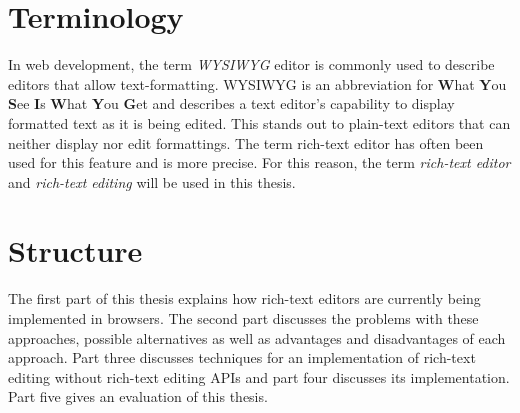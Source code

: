 \section{Terminology}

In web development, the term \textit{WYSIWYG} editor is commonly used to describe editors that allow text-formatting. WYSIWYG is an abbreviation for \textbf{W}hat \textbf{Y}ou \textbf{S}ee \textbf{I}s \textbf{W}hat \textbf{Y}ou \textbf{G}et and describes a text editor's capability to display formatted text as it is being edited. This stands out to plain-text editors that can neither display nor edit formattings. The term rich-text editor has often been used for this feature and is more precise. For this reason, the term \textit{rich-text editor} and \textit{rich-text editing} will be used in this thesis.

\section{Structure}

The first part of this thesis explains how rich-text editors are currently being implemented in browsers. The second part discusses the problems with these approaches, possible alternatives as well as advantages and disadvantages of each approach. Part three discusses techniques for an implementation of rich-text editing without rich-text editing APIs and part four discusses its implementation. Part five gives an evaluation of this thesis.